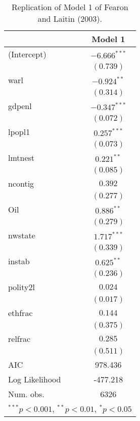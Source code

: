 \documentclass[12pt]{article}\usepackage[]{graphicx}\usepackage[]{color}
\begin{document}
\begin{table}
\begin{center}
\begin{tabular}{l c }
\hline
 & Model 1 \\
\hline
(Intercept)    & $-6.666^{***}$ \\
               & $(0.739)$      \\
warl           & $-0.924^{**}$  \\
               & $(0.314)$      \\
gdpenl         & $-0.347^{***}$ \\
               & $(0.072)$      \\
lpopl1         & $0.257^{***}$  \\
               & $(0.073)$      \\
lmtnest        & $0.221^{**}$   \\
               & $(0.085)$      \\
ncontig        & $0.392$        \\
               & $(0.277)$      \\
Oil            & $0.886^{**}$   \\
               & $(0.279)$      \\
nwstate        & $1.717^{***}$  \\
               & $(0.339)$      \\
instab         & $0.625^{**}$   \\
               & $(0.236)$      \\
polity2l       & $0.024$        \\
               & $(0.017)$      \\
ethfrac        & $0.144$        \\
               & $(0.375)$      \\
relfrac        & $0.285$        \\
               & $(0.511)$      \\
\hline
AIC            & 978.436        \\
Log Likelihood & -477.218       \\
Num. obs.      & 6326           \\
\hline
\multicolumn{2}{l}{\scriptsize{$^{***}p<0.001$, $^{**}p<0.01$, $^*p<0.05$}}
\end{tabular}
\caption{Replication of Model 1 of Fearon and Laitin (2003).}
\label{table:coefficients}
\end{center}
\end{table}
\end{document}
